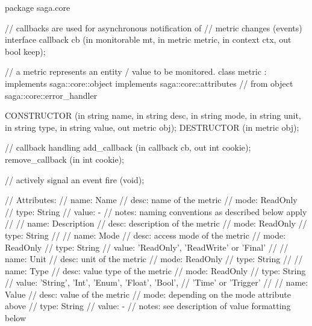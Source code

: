  \begin{myspec}
  package saga.core
  {
    // callbacks are used for asynchronous notification of
    // metric changes (events)
    interface callback
    {
      cb               (in  monitorable     mt,
                        in  metric          metric,
                        in  context         ctx,
                        out bool            keep);
    }
 
 
    // a metric represents an entity / value to be monitored.
    class metric : implements   saga::core::object
                   implements   saga::core::attributes
                // from object  saga::core::error_handler
    {
      CONSTRUCTOR        (in  string          name,
                          in  string          desc,
                          in  string          mode,
                          in  string          unit,
                          in  string          type,
                          in  string          value,
                          out metric          obj);
      DESTRUCTOR         (in  metric          obj);
 
      // callback handling
      add_callback       (in  callback        cb,
                          out int             cookie);
      remove_callback    (in  int             cookie);
 
      // actively signal an event
      fire               (void);
 
 
      // Attributes:
      //   name:  Name
      //   desc:  name of the metric
      //   mode:  ReadOnly
      //   type:  String
      //   value: -
      //   notes: naming conventions as described below apply
      //
      //   name:  Description
      //   desc:  description of the metric
      //   mode:  ReadOnly
      //   type:  String
      //
      //   name:  Mode
      //   desc:  access mode of the metric
      //   mode:  ReadOnly
      //   type:  String
      //   value: 'ReadOnly', 'ReadWrite' or 'Final'
      //
      //   name:  Unit
      //   desc:  unit of the metric
      //   mode:  ReadOnly
      //   type:  String
      //
      //   name:  Type
      //   desc:  value type of the metric
      //   mode:  ReadOnly
      //   type:  String
      //   value: 'String', 'Int', 'Enum', 'Float', 'Bool', 
      //          'Time' or 'Trigger'
      //
      //   name:  Value
      //   desc:  value of the metric
      //   mode:  depending on the mode attribute above
      //   type:  String
      //   value: -
      //   notes: see description of value formatting below
    }
 
}
\end{myspec}
